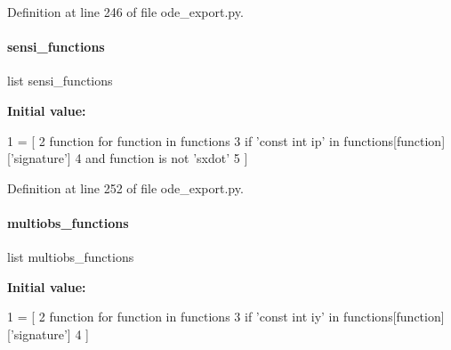 Definition at line 246 of file ode\+\_\+export.\+py.

\mbox{\label{namespaceamici_1_1ode__export_aceecbd374d0134e5683a78e882c3977d}} 
\paragraph{\texorpdfstring{sensi\+\_\+functions}{sensi\_functions}}
{\footnotesize\ttfamily list sensi\+\_\+functions}

{\bfseries Initial value\+:}
\begin{DoxyCode}
1 =  [
2     function \textcolor{keywordflow}{for} function \textcolor{keywordflow}{in} functions
3     \textcolor{keywordflow}{if} \textcolor{stringliteral}{'const int ip'} \textcolor{keywordflow}{in} functions[function][\textcolor{stringliteral}{'signature'}]
4     \textcolor{keywordflow}{and} function \textcolor{keywordflow}{is} \textcolor{keywordflow}{not} \textcolor{stringliteral}{'sxdot'}
5 ]
\end{DoxyCode}


Definition at line 252 of file ode\+\_\+export.\+py.

\mbox{\label{namespaceamici_1_1ode__export_a8a1eabf284172d18098ca450147d94ca}} 
\paragraph{\texorpdfstring{multiobs\+\_\+functions}{multiobs\_functions}}
{\footnotesize\ttfamily list multiobs\+\_\+functions}

{\bfseries Initial value\+:}
\begin{DoxyCode}
1 =  [
2     function \textcolor{keywordflow}{for} function \textcolor{keywordflow}{in} functions
3     \textcolor{keywordflow}{if} \textcolor{stringliteral}{'const int iy'} \textcolor{keywordflow}{in} functions[function][\textcolor{stringliteral}{'signature'}]
4 ]
\end{DoxyCode}


